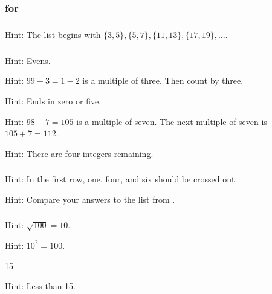 \subsection{\answers}

\subsubsection{\answers for  \subprimes}

\subsubsection*{ \answers}
    Hint: The list begins with $\{3,5\}, \{5,7\},\{11,13\},\{17,19\}, \ldots$.

\subsubsection*{ \answers}
\begin{apart}
    \item Hint: Evens.
    \item Hint: $99+3=1-2$ is a multiple of three.  Then count by three.

    \item Hint: Ends in zero or five.
    \item Hint: $98+7=105$ is a multiple of seven. The next multiple of seven is $105+7=112$.
    \item Hint: There are four integers remaining.
\end{apart}

\subsubsection*{ \answers}
\begin{apart}
    \item Hint: In the first row, one, four, and six should be crossed out.
    \item Hint: Compare your answers to the list from .
\end{apart}

\subsubsection*{ \answers}
\begin{apart}
    \item Hint: $\sqrt{100}=10$.
    \item Hint: $10^2=100$.
    \item 15
    \item Hint: Less than 15.
\end{apart}


